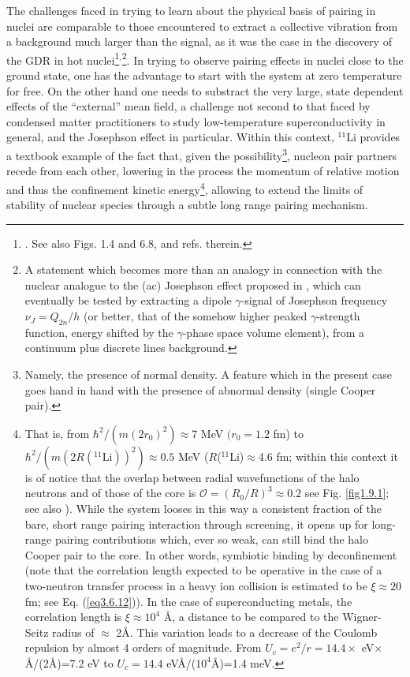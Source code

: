 The challenges faced in trying to learn about the physical basis of pairing in nuclei are comparable to those encountered to extract a   collective vibration from a background much larger than the signal, as it was the case  in the discovery of the GDR in hot nuclei\footnote{\cite{Snover:86,Gaardhoje:85,Gaardhoje:86}. See also \cite{Bortignon:98} Figs. 1.4 and 6.8, and refs. therein.}$^,$\footnote{A statement which becomes more than an analogy in connection with the nuclear analogue to the (ac) Josephson effect proposed in \cite{Potel:21}, which can eventually be tested by extracting a dipole $\gamma$-signal of Josephson frequency $\nu_J=Q_{2n}/h$ (or better, that of the somehow higher peaked $\gamma$-strength function, energy shifted by the $\gamma$-phase space volume element), from a continuum plus discrete lines background.}. In trying to observe  pairing effects in nuclei close to the ground state, one has the advantage to start with the system at zero temperature for free. On the other hand one needs to substract the very large, state dependent effects of the ``external'' mean field, a challenge not second to that faced by condensed matter practitioners to study low-temperature superconductivity in general, and the Josephson effect in particular.  Within this context, $^{11}$Li provides a textbook example of the fact that, given the possibility\footnote{\label{f39C4} Namely, the presence of normal density. A feature which in the present case goes hand in hand with the presence of abnormal density (single Cooper pair).}, nucleon pair partners recede from each other, lowering in the process the momentum of relative motion and thus the confinement kinetic 
 energy\footnote{\label{f40C4} That is, from $\hbar^2/(m(2r_0)^2)\approx 7$ MeV $(r_0=1.2$ fm) to $\hbar^2/(m(2R(^{11}\text{Li}))^2)\approx 0.5$ MeV ($R$($^{11}$Li)$\approx$4.6 fm; within this context it is of notice that the overlap between radial wavefunctions of the halo neutrons and of those of the core is $\mathcal O=(R_0/R)^3\approx0.2$  see Fig. \ref{fig1.9.1}; see also \cite{Broglia:19b}). While the system looses in this way a consistent fraction of the bare, short range pairing interaction through screening, it opens up for long-range pairing contributions which, ever so weak, can still bind the halo Cooper pair to the core. In other words, symbiotic binding by  deconfinement (note that the correlation length expected to be operative in the case of a two-neutron transfer process in a heavy ion collision is estimated to be $\xi\approx20$ fm;  see Eq. (\ref{eq3.6.12})). In the case of superconducting metals, the correlation length is $\xi\approx 10^4$ \AA, a distance to be compared to the Wigner-Seitz radius of $\approx$ 2\AA. This variation leads to a decrease of the Coulomb repulsion by almost 4 orders of magnitude. From $U_c=e^2/r=14.4\times$ eV$\times$\AA/(2\AA)=7.2 eV to $U_c=14.4$ eV\AA/($10^4$\AA)=1.4 meV.}, allowing to extend the limits of stability of nuclear species through a subtle long range pairing mechanism. 

